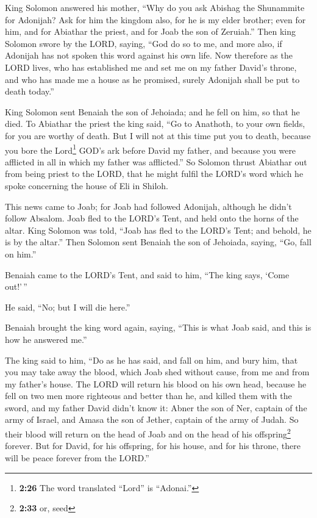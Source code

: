  King Solomon answered his mother, ``Why do you ask
Abishag the Shunammite for Adonijah? Ask for him the kingdom also, for
he is my elder brother; even for him, and for Abiathar the priest, and
for Joab the son of Zeruiah.''  Then king Solomon swore
by the LORD, saying, ``God do so to me, and more also, if Adonijah has
not spoken this word against his own life.  Now therefore
as the LORD lives, who has established me and set me on my father
David's throne, and who has made me a house as he promised, surely
Adonijah shall be put to death today.''

 King Solomon sent Benaiah the son of Jehoiada; and he
fell on him, so that he died.  To Abiathar the priest the
king said, ``Go to Anathoth, to your own fields, for you are worthy of
death. But I will not at this time put you to death, because you bore
the Lord\footnote{\textbf{2:26} The word translated ``Lord'' is
  ``Adonai.''} GOD's ark before David my father, and because you were
afflicted in all in which my father was afflicted.''  So
Solomon thrust Abiathar out from being priest to the LORD, that he might
fulfil the LORD's word which he spoke concerning the house of Eli in
Shiloh.

 This news came to Joab; for Joab had followed Adonijah,
although he didn't follow Absalom. Joab fled to the LORD's Tent, and
held onto the horns of the altar.  King Solomon was told,
``Joab has fled to the LORD's Tent; and behold, he is by the altar.''
Then Solomon sent Benaiah the son of Jehoiada, saying, ``Go, fall on
him.''

 Benaiah came to the LORD's Tent, and said to him, ``The
king says, `Come out!'\,''

He said, ``No; but I will die here.''

Benaiah brought the king word again, saying, ``This is what Joab said,
and this is how he answered me.''

 The king said to him, ``Do as he has said, and fall on
him, and bury him, that you may take away the blood, which Joab shed
without cause, from me and from my father's house.  The
LORD will return his blood on his own head, because he fell on two men
more righteous and better than he, and killed them with the sword, and
my father David didn't know it: Abner the son of Ner, captain of the
army of Israel, and Amasa the son of Jether, captain of the army of
Judah.  So their blood will return on the head of Joab
and on the head of his offspring\footnote{\textbf{2:33} or, seed}
forever. But for David, for his offspring, for his house, and for his
throne, there will be peace forever from the LORD.''

